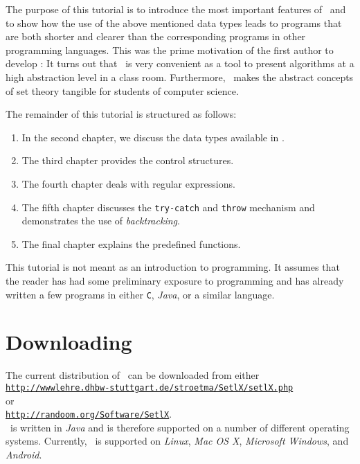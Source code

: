 The purpose of this tutorial is to introduce the most important features of \setlx\ and to
show how the use of the above mentioned data types leads to programs that are both shorter
and clearer than the corresponding programs in other programming languages.  This was the
prime motivation of the first author to develop \setlx:  It turns out that \setlx\ is very
convenient as a tool to present algorithms at a high abstraction level in a class room. 
Furthermore, \setlx\ makes the abstract concepts of set theory tangible for students of
computer science. 
\pagebreak

\noindent 
The remainder
of this tutorial is structured as follows:
\begin{enumerate}
\item In the second chapter, we discuss the data types available in \setlx.
\item The third chapter provides the control structures.
\item The fourth chapter deals with regular expressions.
\item The fifth chapter discusses the \texttt{try-}\texttt{catch} and \texttt{throw}
      mechanism and demonstrates the use of \emph{backtracking}.
\item The final chapter explains the predefined functions.
\end{enumerate}
This tutorial is not meant as an introduction to programming.  It assumes that the reader
has had some preliminary exposure to programming and has already written a few programs in
either \texttt{C}, \textsl{Java}, or a similar language.

\section*{Downloading}
The current distribution of  \setlx\ can be downloaded from either
\\[0.2cm]
\hspace*{1.3cm}
\href{http://wwwlehre.dhbw-stuttgart.de/~stroetma/SetlX/setlX.php}{\texttt{http://wwwlehre.dhbw-stuttgart.de/stroetma/SetlX/setlX.php}}
\\[0.2cm]
or
\\[0.2cm]
\hspace*{1.3cm}
\href{http://randoom.org/Software/SetlX}{\texttt{http://randoom.org/Software/SetlX}}.
\\[0.2cm]
\setlx\ is
written in \textsl{Java} and is therefore supported on a number of different operating
systems.  Currently, \setlx\ is supported on \textsl{Linux}, \textsl{Mac OS X},
\textsl{Microsoft Windows}, and \textsl{Android}.

